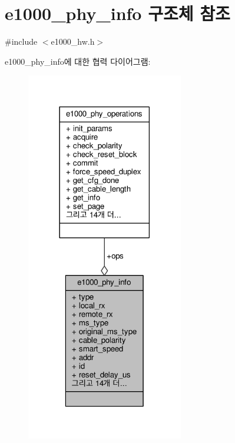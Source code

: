 \hypertarget{structe1000__phy__info}{}\section{e1000\+\_\+phy\+\_\+info 구조체 참조}
\label{structe1000__phy__info}


{\ttfamily \#include $<$e1000\+\_\+hw.\+h$>$}



e1000\+\_\+phy\+\_\+info에 대한 협력 다이어그램\+:
\nopagebreak
\begin{figure}[H]
\begin{center}
\leavevmode
\includegraphics[width=194pt]{structe1000__phy__info__coll__graph}
\end{center}
\end{figure}
